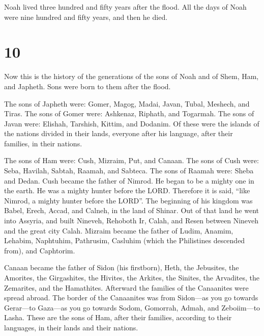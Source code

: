  Noah lived three hundred and fifty years after the
flood.  All the days of Noah were nine hundred and fifty
years, and then he died.

\hypertarget{section-9}{%
\section{10}\label{section-9}}

 Now this is the history of the generations of the sons of
Noah and of Shem, Ham, and Japheth. Sons were born to them after the
flood.

 The sons of Japheth were: Gomer, Magog, Madai, Javan,
Tubal, Meshech, and Tiras.  The sons of Gomer were:
Ashkenaz, Riphath, and Togarmah.  The sons of Javan were:
Elishah, Tarshish, Kittim, and Dodanim.  Of these were the
islands of the nations divided in their lands, everyone after his
language, after their families, in their nations.

 The sons of Ham were: Cush, Mizraim, Put, and Canaan.
 The sons of Cush were: Seba, Havilah, Sabtah, Raamah, and
Sabteca. The sons of Raamah were: Sheba and Dedan.  Cush
became the father of Nimrod. He began to be a mighty one in the earth.
 He was a mighty hunter before the LORD. Therefore it is
said, ``like Nimrod, a mighty hunter before the LORD''. 
The beginning of his kingdom was Babel, Erech, Accad, and Calneh, in the
land of Shinar.  Out of that land he went into Assyria,
and built Nineveh, Rehoboth Ir, Calah,  and Resen between
Nineveh and the great city Calah.  Mizraim became the
father of Ludim, Anamim, Lehabim, Naphtuhim,  Pathrusim,
Casluhim (which the Philistines descended from), and Caphtorim.

 Canaan became the father of Sidon (his firstborn), Heth,
 the Jebusites, the Amorites, the Girgashites,
 the Hivites, the Arkites, the Sinites, 
the Arvadites, the Zemarites, and the Hamathites. Afterward the families
of the Canaanites were spread abroad.  The border of the
Canaanites was from Sidon---as you go towards Gerar---to Gaza---as you
go towards Sodom, Gomorrah, Admah, and Zeboiim---to Lasha.
 These are the sons of Ham, after their families,
according to their languages, in their lands and their nations.

